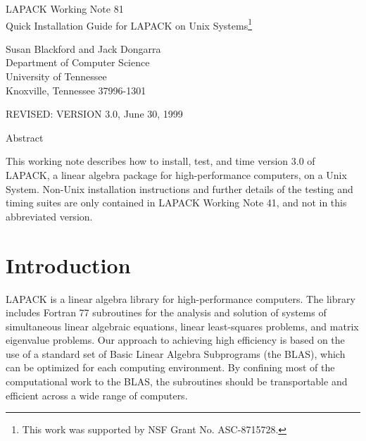 \documentclass[11pt]{report}
\begin{document}
\begin{center}
  {\Large LAPACK Working Note 81\\
  Quick Installation Guide for LAPACK on Unix Systems\footnote{This work was
 supported by NSF Grant No. ASC-8715728.}}
\end{center}
\begin{center}
  Susan Blackford and Jack Dongarra\\
  Department of Computer Science \\
  University of Tennessee \\
  Knoxville, Tennessee  37996-1301 \\
\end{center}
\begin{center}
  REVISED:  VERSION 3.0, June 30, 1999
\end{center}

\begin{center}
Abstract
\end{center}
This working note describes how to install, test, and time version 3.0
of LAPACK, a linear algebra package for high-performance
computers, on a Unix System.  Non-Unix installation instructions and
further details of the testing and timing suites are only contained in
LAPACK Working Note 41, and not in this abbreviated version.
\newpage

\tableofcontents

\newpage

\section{Introduction}

LAPACK is a linear algebra library for high-performance
computers.
The library includes Fortran 77 subroutines for 
the analysis and solution of systems of simultaneous linear algebraic
equations, linear least-squares problems, and matrix eigenvalue
problems.
Our approach to achieving high efficiency is based on the use of
a standard set of Basic Linear Algebra Subprograms (the BLAS),
which can be optimized for each computing environment.
By confining most of the computational work to the BLAS,
the subroutines should be 
transportable and efficient across a wide range of computers.
\end{document}
